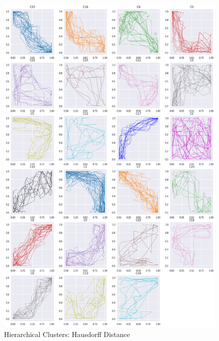 \begin{figure}[h]
  \centering
  \includegraphics[width=\linewidth,height=\textheight,keepaspectratio]{figs/clusters/CLU_H_ALL[Hd].png}
  \caption{ Hierarchical Clusters: Hausdorff Distance}
\end{figure}

